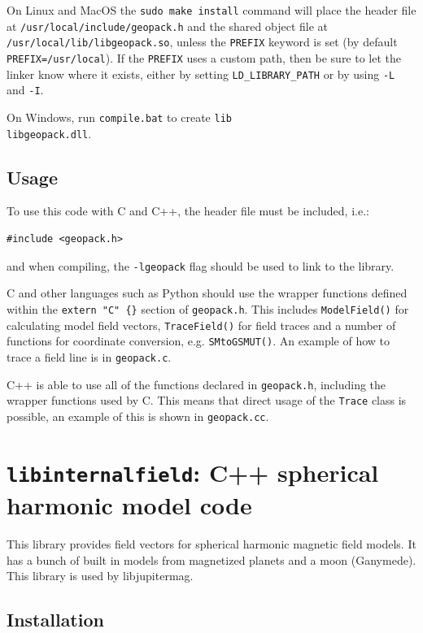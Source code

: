 			On Linux and MacOS the \texttt{sudo make install} command will place the header file at \texttt{/usr/local/include/geopack.h} and the shared object file at \texttt{/usr/local/lib/libgeopack.so}, unless the \texttt{PREFIX} keyword is set (by default \texttt{PREFIX=/usr/local}). If the \texttt{PREFIX} uses a custom path, then be sure to let the linker know where it exists, either by setting \texttt{LD\_LIBRARY\_PATH} or by using \texttt{-L} and \texttt{-I}.

			On Windows, run \texttt{compile.bat} to create \texttt{lib\\libgeopack.dll}.

		\subsection{Usage}
			
			To use this code with C and C++, the header file must be included, i.e.:
			\begin{verbatim}
#include <geopack.h>
			\end{verbatim}
			and when compiling, the \texttt{-lgeopack} flag should be used to link to the library. 

			C and other languages such as Python should use the wrapper functions defined within the \texttt{extern "C" \{\}} section of \texttt{geopack.h}. This includes \texttt{ModelField()} for calculating model field vectors, \texttt{TraceField()} for field traces and a number of functions for coordinate conversion, e.g. \texttt{SMtoGSMUT()}. An example of how to trace a field line is in \texttt{geopack\tests\test.c}.

			C++ is able to use all of the functions declared in \texttt{geopack.h}, including the wrapper functions used by C. This means that direct usage of the \texttt{Trace} class is possible, an example of this is shown in \texttt{geopack\tests\test.cc}.
			

	\section{\texttt{libinternalfield}: C++ spherical harmonic model code}

		This library provides field vectors for spherical harmonic magnetic field models. It has a bunch of built in models from magnetized planets and a moon (Ganymede). This library is used by libjupitermag.

		\subsection{Installation}

